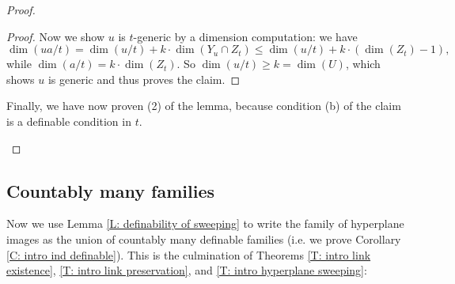 \documentclass{amsart}
\theoremstyle{definition}
\begin{document}
\begin{proof}
\begin{enumerate}
\begin{proof}
        Now we show $u$ is $t$-generic by a dimension computation: we have $$\dim(ua/t)=\dim(u/t)+k\cdot\dim(Y_u\cap Z_t)\leq\dim(u/t)+k\cdot(\dim(Z_t)-1),$$ while $\dim(a/t)=k\cdot\dim(Z_t)$. So $\dim(u/t)\geq k=\dim(U)$, which shows $u$ is generic and thus proves the claim.
        \end{proof}
        Finally, we have now proven (2) of the lemma, because condition (b) of the claim is a definable condition in $t$.
        \end{enumerate}
\end{proof}

\subsection{Countably many families}

Now we use Lemma \ref{L: definability of sweeping} to write the family of hyperplane images as the union of countably many definable families (i.e. we prove Corollary \ref{C: intro ind definable}). This is the culmination of Theorems \ref{T: intro link existence}, \ref{T: intro link preservation}, and \ref{T: intro hyperplane sweeping}:
\end{document}
